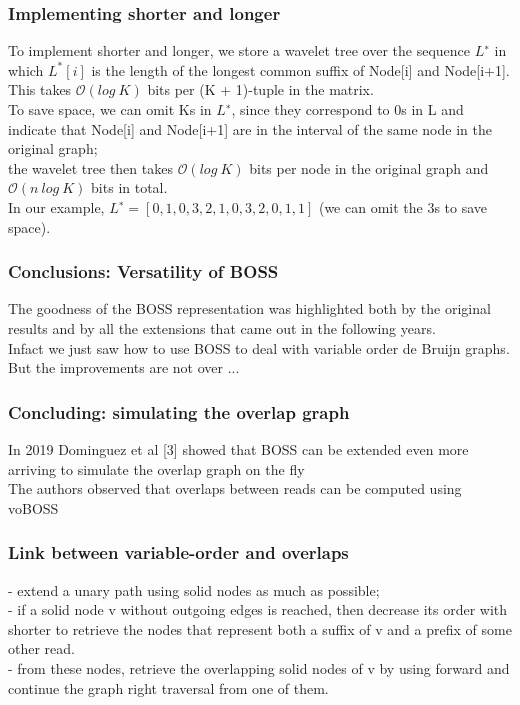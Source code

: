 \begin{frame}
\frametitle{Implementing shorter and longer}
To implement shorter and longer, we store a wavelet tree over the sequence $L^∗$
in which $L^* [i]$ is the length of the longest common suffix of Node[i] and Node[i+1].
\\ \medskip
This takes $\mathcal{O}(log\ K)$ bits per (K + 1)-tuple in the matrix.\\
To save space, we can omit Ks in $L^∗$, since they correspond to 0s in L and indicate that Node[i] and Node[i+1] are in the interval of the same node in the original graph;
\\ \medskip 
the wavelet tree then takes $\mathcal{O}(log\ K)$ bits per node in the original graph and $\mathcal{O}(n\ log\ K)$  bits in total.
\\ \medskip
In our example, $L^∗ = [0, 1, 0, 3, 2, 1, 0, 3, 2, 0, 1, 1 ]$
(we can omit the 3s to save space).
\end{frame}


\begin{frame}
\frametitle{Conclusions: Versatility of BOSS}
The goodness of the BOSS representation was highlighted both by the original results and by all the extensions that came out in the following years.
\\ \medskip
Infact we just saw how to use BOSS to deal with variable order de Bruijn graphs.
\\ \medskip
But the improvements are not over ...
\end{frame}


\begin{frame}
\frametitle{Concluding: simulating the overlap graph}
In 2019 Dominguez et al [3] showed that BOSS can be extended even more arriving to simulate the overlap graph on the fly
\\ \medskip
The authors observed that overlaps between reads can be computed using voBOSS
\end{frame}

\begin{frame}
\frametitle{Link between variable-order and overlaps}
- extend a unary path using solid nodes as much as possible; 
\\ \medskip
- if a solid node v without outgoing edges is reached, then decrease its order with shorter to retrieve the nodes that represent both a suffix of v and a prefix of some other read.
\\ \medskip
- from these nodes, retrieve the overlapping solid nodes of v by using forward and continue the graph right traversal from one of them.
\end{frame}

